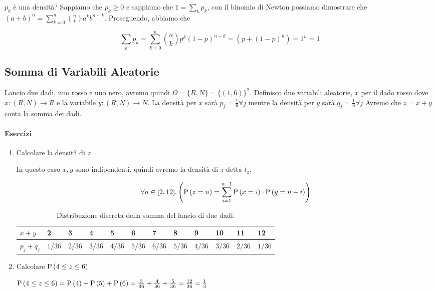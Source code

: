 $ p_k $ è una densità? Sappiamo che $ p_k \geq 0 $ e sappiamo che $ 1 = \sum_{k} p_k $, con il binomio di Newton possiamo dimostrare che $ (a+b)^n = \sum_{k=0}^{n} \binom{n}{k} a^k b^{n-k} $. Proseguendo, abbiamo che 

\[ \sum_{k} p_k = \sum_{k=0}^{n} \binom{n}{k} p^k (1-p)^{n-k} = (p+(1-p)^n) = 1^n = 1 \]

\subsection{Somma di Variabili Aleatorie}
Lancio due dadi, uno rosso e uno nero, avremo quindi $ \Omega = \{R, N\} = \{(1,6)\}^2 $. Definisco due variabili aleatorie, $ x $ per il dado rosso dove $ x : (R, N) \to R $ e la variabile $ y : (R, N) \to N $. La densità per $ x $ sarà $ p_j = \frac{1}{6} \forall j $ mentre la densità per $ y $ sarà $ q_j = \frac{1}{6} \forall j $
Avremo che $ z = x + y $ conta la somma dei dadi.

\paragraph{Esercizi}
\begin{enumerate}
	\item Calcolare la densità di $ z $
		
		In questo caso $ x, y $ sono indipendenti, quindi avremo la densità di $ z $ detta $ t_z $.
		
		\[ \forall n \in [2, 12] .  \left( \text{P}\left(z = n\right) = \sum_{i=1}^{n-1} \text{P}\left(x = i\right) \cdot \text{P}\left(y = n - i\right) \right) \]
		
		\begin{table}[H]
			\centering
			\caption{Distribuzione discreta della somma del lancio di due dadi.}
			\label{tab:distribdice1}
			\begin{tabular}{|l|l|l|l|l|l|l|l|l|l|l|l|}
				\hline
				$ x + y $     & 2        & 3        & 4        & 5        & 6        & 7        & 8        & 9        & 10       & 11       & 12       \\ \hline
				$ p_j + q_j $ & $ 1/36 $ & $ 2/36 $ & $ 3/36 $ & $ 4/36 $ & $ 5/36 $ & $ 6/36 $ & $ 5/36 $ & $ 4/36 $ & $ 3/36 $ & $ 2/36 $ & $ 1/36 $ \\ \hline
			\end{tabular}
		\end{table}
		
	\item Calcolare $ \text{P}\left(4 \leq z \leq 6\right) $
	
	$ \text{P}\left(4 \leq z \leq 6\right) = \text{P}\left(4\right) + \text{P}\left(5\right) + \text{P}\left(6\right) = \frac{3}{36} + \frac{4}{36} + \frac{5}{36} = \frac{12}{36} = \frac{1}{3} $
\end{enumerate}

